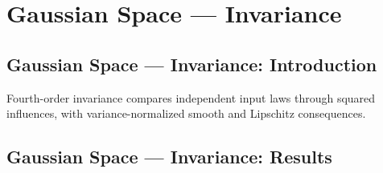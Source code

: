 \section{Gaussian Space --- Invariance}
\subsection*{Gaussian Space --- Invariance: Introduction}
Fourth-order invariance compares independent input laws through squared influences, with variance-normalized smooth and Lipschitz consequences.

\subsection*{Gaussian Space --- Invariance: Results}

